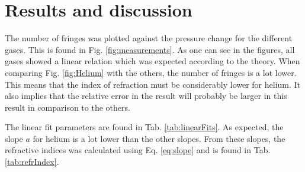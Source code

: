 \section{Results and discussion}
The number of fringes was plotted against the pressure change for the different gases. This is found in Fig. \ref{fig:measurements}. As one can see in the figures, all gases showed a linear relation which was expected according to the theory. When comparing Fig. \ref{fig:Helium} with the others, the number of fringes is a lot lower. This means that the index of refraction must be considerably lower for helium. It also implies that the relative error in the result will probably be larger in this result in comparison to the others.

The linear fit parameters are found in Tab. \ref{tab:linearFits}. As expected, the slope $a$ for helium is a lot lower than the other slopes. From these slopes, the refractive indices was calculated using Eq. \eqref{eq:slope} and is found in Tab. \ref{tab:refrIndex}.


